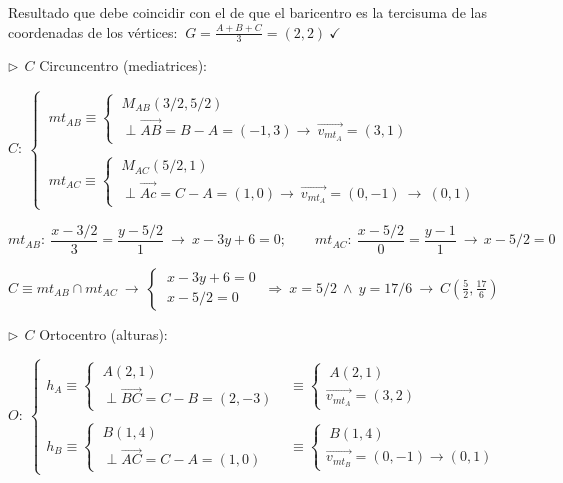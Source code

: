 \begin{miejercicio}
\vspace{3mm} \textcolor{gris}{Resultado que debe coincidir con el de que el baricentro es la tercisuma de las coordenadas de los vértices: $\ G=\frac{A+B+C}{3}=(2,2)\ \checkmark\ $ \smiley{}   }


\vspace{5mm} $\triangleright \ \ C $ Circuncentro (mediatrices):

\vspace{2mm} $C:\ \begin{cases}
\ mt_{AB} \equiv \begin{cases}  \ M_{AB}(3/2,5/2) \\ \ \perp  \overrightarrow{AB}=B-A=(-1,3) \to \ \overrightarrow{v_{mt_A}}=(3,1) \end{cases}  
\\ \\
\ mt_{AC} \equiv \begin{cases}  \ M_{AC}(5/2,1) \\ \ \perp  \overrightarrow{Ac}=C-A=(1,0) \to \ \overrightarrow{v_{mt_A}}=(0,-1) \ \to \ (0,1) \end{cases} 
\end{cases}$

\vspace{3mm} $mt_{AB}:\ \dfrac{x-3/2}{3}=\dfrac{y-5/2}{1} \ \to \ x-3y+6=0 ;\qquad mt_{AC}:\ \dfrac{x-5/2}{0}=\dfrac{y-1}{1} \ \to \, x-5/2=0 $

\vspace{2mm} $C\equiv mt_{AB} \cap mt_{AC} \ \to \ \begin{cases} \ x-3y+6=0 \\ \ x-5/2=0 \end{cases} \ \Rightarrow \ x=5/2 \ \wedge \ y=17/6 \ \longrightarrow \ C\left( \frac 5 2 ,\frac{17}{6} \right)$


\vspace{5mm} $\triangleright \ \ C $ Ortocentro (alturas):

\vspace{2mm} $O:\ \begin{cases}
h_A \equiv \begin{cases}  \ A(2,1) \\ \ \perp \overrightarrow{BC}=C-B=(2,-3) \end{cases} &\equiv 
		\begin{cases}  \ A(2,1) \\ \overrightarrow{v_{mt_A}}=(3,2) \end{cases}
\\ \\
h_B \equiv \begin{cases} \ B(1,4) \\ \ \perp \overrightarrow{AC}=C-A=(1,0)  \end{cases}	&\equiv 
		\begin{cases} \ B(1,4) \\ \overrightarrow{v_{mt_B}}=(0,-1) \to (0,1) \end{cases}
\end{cases}$


\end{miejercicio}

